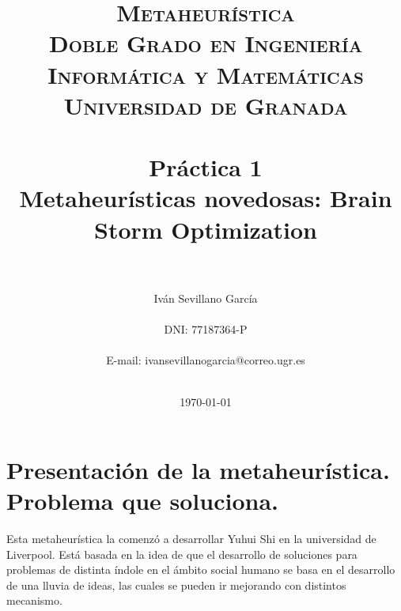 


\title{
\normalfont \normalsize
\textsc{\textbf{Metaheurística} \\ Doble Grado en Ingeniería Informática y Matemáticas \\ Universidad de Granada} \\ [25pt] %
\horrule{0.5pt} \\[0.4cm] %
\Huge Práctica 1\\
\LARGE Metaheurísticas novedosas: Brain Storm Optimization
 \\ %
\horrule{2pt} \\[0.5cm] %
}

\author{ Iván Sevillano García \\\\
	DNI: 77187364-P\\ \\
	E-mail: ivansevillanogarcia@correo.ugr.es\\\\
	} %

\date{\normalsize\today} %




\maketitle %

\newpage

\tableofcontents
\newpage

\section{Presentación de la metaheurística. Problema que soluciona.}

Esta metaheurística la comenzó a desarrollar Yuhui Shi en la universidad de Liverpool\cite{BSO}. Está basada en la idea de que el desarrollo de soluciones para problemas de distinta índole en el ámbito social humano se basa en el desarrollo de una lluvia de ideas, las cuales se pueden ir mejorando con distintos mecanismo. \\

